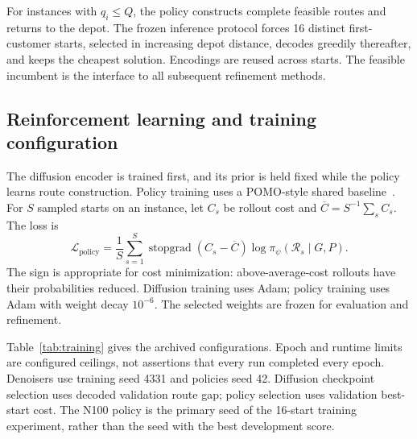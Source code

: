 \documentclass[11pt,a4paper]{article}
\newcommand{\R}{\mathcal{R}}
\begin{document}
For instances with $q_i\leq Q$, the policy constructs complete feasible
routes and returns to the depot. The frozen inference protocol forces
16 distinct first-customer starts, selected in increasing depot distance,
decodes greedily thereafter, and keeps the cheapest solution. Encodings
are reused across starts. The feasible incumbent is the interface to
all subsequent refinement methods.

\subsection{Reinforcement learning and training configuration}

The diffusion encoder is trained first, and its prior is held fixed while
the policy learns route construction. Policy training uses a POMO-style
shared baseline~\cite{kwon2020pomo}. For $S$ sampled starts on an instance,
let $C_s$ be rollout cost and $\overline C=S^{-1}\sum_s C_s$. The loss is
\begin{equation}
 \mathcal L_{\mathrm{policy}}=
 \frac1S\sum_{s=1}^{S}\operatorname{stopgrad}(C_s-\overline C)
       \log\pi_\psi(\R_s\mid G,P).
 \label{eq:policy-loss}
\end{equation}
The sign is appropriate for cost minimization: above-average-cost
rollouts have their probabilities reduced. Diffusion training uses Adam;
policy training uses Adam with weight decay $10^{-6}$. The selected
weights are frozen for evaluation and refinement.

Table~\ref{tab:training} gives the archived configurations. Epoch and
runtime limits are configured ceilings, not assertions that every run
completed every epoch. Denoisers use training seed 4331 and policies
seed 42. Diffusion checkpoint selection uses decoded validation route
gap; policy selection uses validation best-start cost. The N100 policy
is the primary seed of the 16-start training experiment, rather than
the seed with the best development score.
\end{document}
